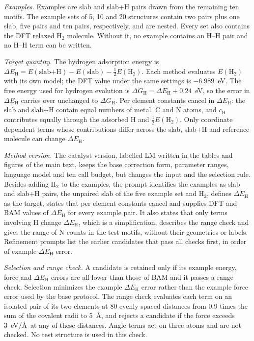 \textit{Examples.} Examples are slab and slab+H pairs drawn from the remaining ten motifs. The example sets of 5, 10 and 20 structures contain two pairs plus one slab, five pairs and ten pairs, respectively, and are nested. Every set also contains the DFT relaxed H$_2$ molecule. Without it, no example contains an H--H pair and no H--H term can be written.

\textit{Target quantity.} The hydrogen adsorption energy is $\Delta E_\mathrm{H} = E(\text{slab+H}) - E(\text{slab}) - \tfrac{1}{2}E(\mathrm{H_2})$. Each method evaluates $E(\mathrm{H_2})$ with its own model; the DFT value under the same settings is $-6.989$~eV. The free energy used for hydrogen evolution is $\Delta G_\mathrm{H} = \Delta E_\mathrm{H} + 0.24$~eV, so the error in $\Delta E_\mathrm{H}$ carries over unchanged to $\Delta G_\mathrm{H}$. Per element constants cancel in $\Delta E_\mathrm{H}$: the slab and slab+H contain equal numbers of metal, C and N atoms, and $c_\mathrm{H}$ contributes equally through the adsorbed H and $\tfrac{1}{2}E(\mathrm{H_2})$. Only coordinate dependent terms whose contributions differ across the slab, slab+H and reference molecule can change $\Delta E_\mathrm{H}$.

\textit{Method version.} The catalyst version, labelled LM written in the tables and figures of the main text, keeps the base correction form, parameter ranges, language model and ten call budget, but changes the input and the selection rule. Besides adding H$_2$ to the examples, the prompt identifies the examples as slab and slab+H pairs, the unpaired slab of the five example set and H$_2$, defines $\Delta E_\mathrm{H}$ as the target, states that per element constants cancel and supplies DFT and BAM values of $\Delta E_\mathrm{H}$ for every example pair. It also states that only terms involving H change $\Delta E_\mathrm{H}$, which is a simplification, describes the range check and gives the range of N counts in the test motifs, without their geometries or labels. Refinement prompts list the earlier candidates that pass all checks first, in order of example $\Delta E_\mathrm{H}$ error.

\textit{Selection and range check.} A candidate is retained only if its example energy, force and $\Delta E_\mathrm{H}$ errors are all lower than those of BAM and it passes a range check. Selection minimizes the example $\Delta E_\mathrm{H}$ error rather than the example force error used by the base protocol. The range check evaluates each term on an isolated pair of its two elements at 80 evenly spaced distances from 0.9 times the sum of the covalent radii to 5~\AA, and rejects a candidate if the force exceeds 3~eV/\AA\ at any of these distances. Angle terms act on three atoms and are not checked. No test structure is used in this check.

